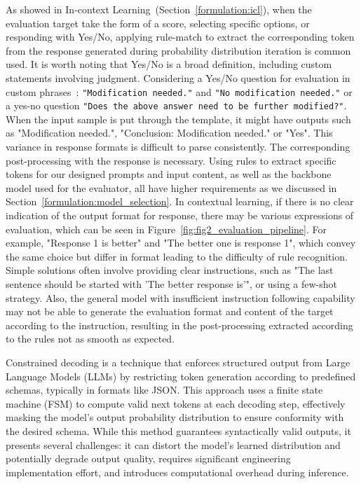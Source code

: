 As showed in In-context Learning~(Section~\ref{formulation:icl}), when the evaluation target take the form of a score, selecting specific options, or responding with Yes/No, applying rule-match to extract the corresponding token from the response generated during probability distribution iteration is common used. It is worth noting that Yes/No is a broad definition, including custom statements involving judgment.
Considering a Yes/No question for evaluation in custom phrases~\cite{ucla_creativity_macgyver}: \texttt{"Modification needed."} and \texttt{"No modification needed."} or a yes-no question \texttt{"Does the above answer need to be further modified?"}. 
When the input sample is put through the template, it might have outputs such as "Modification needed.", "Conclusion: Modification needed." or "Yes". This variance in response formats is difficult to parse consistently. The corresponding post-processing with the response is necessary. Using rules to extract specific tokens for our designed prompts and input content, as well as the backbone model used for the evaluator, all have higher requirements as we discussed in Section~\ref{formulation:model_selection}.
In contextual learning, if there is no clear indication of the output format for response, there may be various expressions of evaluation, which can be seen in Figure~\ref{fig:fig2_evaluation_pipeline}. For example, "Response 1 is better" and "The better one is response 1", which convey the same choice but differ in format leading to the difficulty of rule recognition. Simple solutions often involve providing clear instructions, such as "The last sentence should be started with 'The better response is'", or using a few-shot strategy.
Also, the general model with insufficient instruction following capability may not be able to generate the evaluation format and content of the target according to the instruction, resulting in the post-processing extracted according to the rules not as smooth as expected. 

Constrained decoding is a technique that enforces structured output from Large Language Models (LLMs) by restricting token generation according to predefined schemas, typically in formats like JSON. This approach uses a finite state machine (FSM) to compute valid next tokens at each decoding step, effectively masking the model's output probability distribution to ensure conformity with the desired schema. While this method guarantees syntactically valid outputs, it presents several challenges: it can distort the model's learned distribution and potentially degrade output quality, requires significant engineering implementation effort, and introduces computational overhead during inference.

